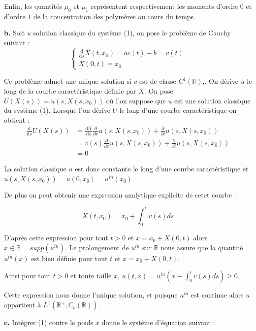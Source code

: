 \documentclass[a4paper]{article}
\newcommand{\pol}{a}
\newcommand{\dep}{b}
\begin{document}
Enfin, les quantités $\mu_0$ et $\mu_1$ représentent respectivement les moments d'ordre $0$ et d'ordre $1$ de la concentration des polymères au cours du temps.

\textbf{b.}
Soit $u$ solution classique du système (1), 
on pose le problème de Cauchy suivant :
\begin{equation}
\begin{cases}
	\label{eq:caract}
	\displaystyle \frac{\mathrm{d}}{\mathrm{d}s} X(t,x_0)
	= \pol c(t) - \dep 
	= v(t)\\
	X(0,t) = x_0
	\end{cases}
	\end{equation}
	
	Ce problème admet une unique solution si $v$ est de classe $C^1(\mathbb{R})$,.
	On dérive $u$ le long de la courbe caractéristique définie par $X$.
	On pose $U(X(s))=u(s, X(s,x_0))$ où l'on suppose que $u$ est une solution classique du système (1).
	Lorsque l'on dérive $U$ le long d'une courbe caractéristique on obtient :
	\[ 
	\begin{split}
		\frac{\mathrm{d}}{\mathrm{d}s} U(X(s)) & = \frac{\mathrm{d} X }{\mathrm{d}s} \frac{\partial}{\partial x}u(s,X(s,x_0)) + \frac{\partial}{\partial t}u(s,X(s,x_0)) \\
		                                 & = v(s) \frac{\partial}{\partial x} u(s,X(s,x_0)) + \frac{\partial}{\partial t} u(s,X(s,x_0))\\
										 & =0 
	\end{split}
		\]
		
	La solution classique $u$ est donc constante le long d'une courbe caractéristique et $u(s,X(s,x_0)) = u(0,x_0)=u^{in}(x_0)$.
	
	De plus on peut obtenir une expression analytique explicite de cetet courbe :
	
	\[ X(t,x_0) = x_0 + \int_0^t v(s)ds \]
	
	D'après cette expression pour tout $t>0$ et $x = x_0 + X(0,t)$ 
	alors $x \in \mathbb{R} = supp(u^{in})$. 
	Le prolongement de $u^{in}$ sur $\mathbb{R}$ nous assure que la quantité
	$u^{in}(x)$ est bien définie pour tout $t$ et $x = x_0 + X(0,t)$.
	
	Ainsi pour tout $t>0$ et toute taille 
	$x$, $u(t,x) = u^{in}(x-\int_0^t v(s)ds)\geq 0$.
	
	Cette expression nous donne l'unique solution, et puisque $u^{in}$ est continue 
	alors $u$ appartient à $L^1(\mathbb{R}^+, C_b(\mathbb{R}))$.

\textbf{c.}
Intégrer (1) contre le poids $x$ donne le système d'équation suivant :
\end{document}
